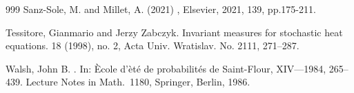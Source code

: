 \documentclass[a4paper,11pt]{article}
\numberwithin{equation}{section}
\theoremstyle{plain}
\theoremstyle{definition}
\numberwithin{NQ}{section}
\numberwithin{LQ}{section}
\numberwithin{ZQ}{section}
\begin{document}
\begin{thebibliography}{999}
	Sanz-Sole, M. and Millet, A. (2021)
	, Elsevier, 2021, 139, pp.175-211.
	
	Tessitore, Gianmario and Jerzy Zabczyk.
	\newblock Invariant measures for stochastic heat equations.
	 18 (1998), no. 2, Acta Univ. Wratislav. No. 2111, 271--287.
	
	 Walsh, John B.
	.
	\newblock In: \`Ecole d'\`et\'e de probabilit\'es de
	Saint-Flour, XIV---1984, 265--439.
	Lecture Notes in Math.\ 1180, Springer, Berlin, 1986.
\end{thebibliography}
\end{document}
